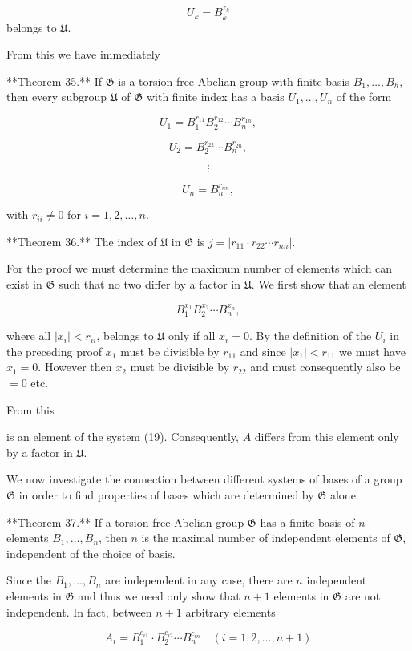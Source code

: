 $$U_k = B_k^{z_k}$$ belongs to $\mathfrak{U}$.

From this we have immediately

**Theorem 35.** If $\mathfrak{G}$ is a torsion-free Abelian group with finite basis $B_1, \ldots, B_h$, then every subgroup $\mathfrak{U}$ of $\mathfrak{G}$ with finite index has a basis $U_1, \ldots, U_n$ of the form

$$U_1 = B_1^{r_{11}} B_2^{r_{12}} \cdots B_n^{r_{1n}},$$

$$U_2 = B_2^{r_{22}} \cdots B_n^{r_{2n}},$$

$$\vdots$$

$$U_n = B_n^{r_{nn}},$$

with $r_{ii} \neq 0$ for $i = 1, 2, \ldots, n$.

**Theorem 36.** The index of $\mathfrak{U}$ in $\mathfrak{G}$ is $j = |r_{11} \cdot r_{22} \cdots r_{nn}|$.

For the proof we must determine the maximum number of elements which can exist in $\mathfrak{G}$ such that no two differ by a factor in $\mathfrak{U}$. We first show that an element

$$B_1^{x_1} B_2^{x_2} \cdots B_n^{x_n},$$

where all $|x_i| < r_{ii}$, belongs to $\mathfrak{U}$ only if all $x_i = 0$. By the definition of the $U_i$ in the preceding proof $x_1$ must be divisible by $r_{11}$ and since $|x_1| < r_{11}$ we must have $x_1 = 0$. However then $x_2$ must be divisible by $r_{22}$ and must consequently also be $= 0$ etc.

From this

is an element of the system (19). Consequently, $A$ differs from this element only by a factor in $\mathfrak{U}$.

We now investigate the connection between different systems of bases of a group $\mathfrak{G}$ in order to find properties of bases which are determined by $\mathfrak{G}$ alone.

**Theorem 37.** If a torsion-free Abelian group $\mathfrak{G}$ has a finite basis of $n$ elements $B_1, \ldots, B_n$, then $n$ is the maximal number of independent elements of $\mathfrak{G}$, independent of the choice of basis.

Since the $B_1, \ldots, B_n$ are independent in any case, there are $n$ independent elements in $\mathfrak{G}$ and thus we need only show that $n + 1$ elements in $\mathfrak{G}$ are not independent. In fact, between $n + 1$ arbitrary elements

$$A_i = B_1^{c_{i1}} \cdot B_2^{c_{i2}} \cdots B_n^{c_{in}} \quad (i = 1, 2, \ldots, n + 1)$$

